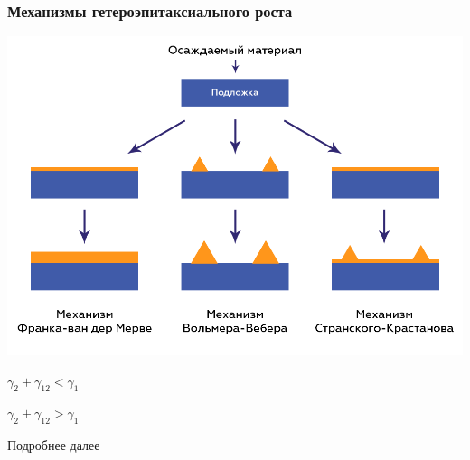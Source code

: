 \documentclass[10pt,pdf,hyperref={unicode}, dvipsnames]{beamer}
\begin{document}
\normalsize
\begin{frame}[t]
	\frametitle{Механизмы гетероэпитаксиального роста}
	\includegraphics[width = \linewidth]{imgs/growth.png}

	\centering
	\begin{minipage}{0.32\linewidth}
		\centering
		$ \gamma_2+\gamma_{12}<\gamma_1 $	
	\end{minipage}
	\begin{minipage}{0.32\linewidth}
		\centering
		$ \gamma_2+\gamma_{12}>\gamma_1 $	
	\end{minipage}
	\begin{minipage}{0.32\linewidth}
		\centering
		Подробнее далее %
	\end{minipage}

\end{frame}
\end{document}
